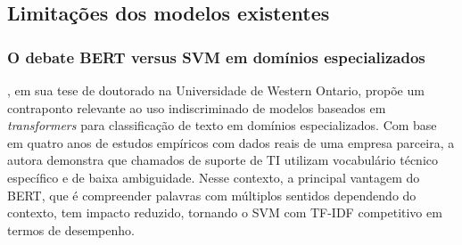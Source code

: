 \documentclass[
    12pt,                %
    openright,           %
    oneside,             %
    a4paper,             %
    english,             %
    brazil               %
]{abntex2}
\let\legendoriginal\legend
\renewcommand{\legend}[1]{\legendoriginal{\small #1}}
\begin{document}
\vspace{0.5cm}

\begin{table}[htb]
    \centering
    \caption{Comparação entre trabalhos relacionados}
    \label{tab:trabalhos_relacionados}
    \vspace{0.2cm}
    \legend{Fonte: Elaborado pelos autores}
\end{table}

\subsection{Limitações dos modelos existentes}
\label{subsec:helpdesk_limitacoes}

\subsubsection{O debate BERT versus SVM em domínios especializados}
\label{subsubsec:helpdesk_debate}

, em sua tese de doutorado na Universidade de Western Ontario, propõe um contraponto relevante ao uso indiscriminado de modelos baseados em \textit{transformers} para classificação de texto em domínios especializados. Com base em quatro anos de estudos empíricos com dados reais de uma empresa parceira, a autora demonstra 
que chamados de suporte de TI utilizam vocabulário técnico específico 
e de baixa ambiguidade. Nesse contexto, a principal vantagem do BERT, que é compreender 
palavras com múltiplos sentidos dependendo do contexto, tem impacto 
reduzido, tornando o SVM com TF-IDF competitivo em termos de 
desempenho.
\end{document}
